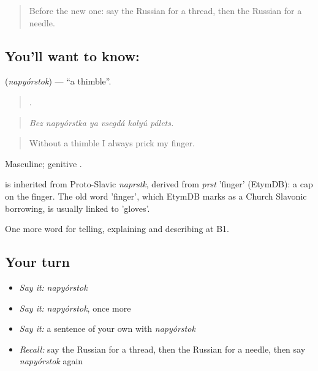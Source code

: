 \label{lesson:RU-C501-napyorstok}



\begin{quote}
Before the new one: say the Russian for a thread, then the Russian for a needle.
\end{quote}

\subsection*{You'll want to know: }
\textbf{} (\emph{napyórstok}) — \textquotedblleft{}a thimble\textquotedblright{}.

\begin{quote}
     .
\end{quote}

\begin{quote}
\emph{Bez napyórstka ya vsegdá kolyú pálets.}
\end{quote}

\begin{quote}
Without a thimble I always prick my finger.
\end{quote}

Masculine; genitive .

\begin{cousinweb}
\emph{} is inherited from Proto-Slavic \emph{naprstk}, derived from \emph{prst} 'finger' (EtymDB): a cap on the finger. The old word \emph{} 'finger', which EtymDB marks as a Church Slavonic borrowing, is usually linked to \emph{} 'gloves'.
\end{cousinweb}

\begin{grammarlens}[title={What you've built}]
One more word for telling, explaining and describing at B1.
\end{grammarlens}

\subsection*{Your turn}
\begin{itemize}
\raggedright
  \item \emph{Say it:} \emph{napyórstok}
  \item \emph{Say it:} \emph{napyórstok}, once more
  \item \emph{Say it:} a sentence of your own with \emph{napyórstok}
  \item \emph{Recall:} say the Russian for a thread, then the Russian for a needle, then say \emph{napyórstok} again
\end{itemize}

